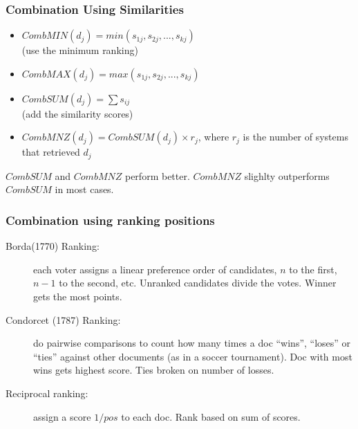 \documentclass{beamer}
\begin{document}
\begin{frame}
    \frametitle{Combination Using Similarities }

    \begin{itemize}
    \item $CombMIN(d_j) = min(s_{1j}, s_{2j}, ..., s_{kj})$ \\ (use the
        minimum ranking)

    \item $CombMAX(d_j) = max(s_{1j}, s_{2j}, ..., s_{kj})$

    \item$ CombSUM(d_j) = \sum{s_{ij}}$ \\ (add the similarity scores)

    \item $CombMNZ(d_j) = CombSUM(d_j) \times r_j$, where $r_j$ is the
        number of systems that retrieved $d_j$

    \end{itemize}

    \begin{block}{}

        $CombSUM$ and $CombMNZ$ perform better. $CombMNZ$ slighlty outperforms $CombSUM$
        in most cases.
    \end{block}
\end{frame}


\begin{frame}
    \frametitle{Combination using ranking positions }

    \begin{description}
    \item [Borda(1770) Ranking:] each voter assigns a linear preference
        order of candidates, $n$ to the first, $n-1$ to the second,
        etc. Unranked candidates divide the votes. Winner gets the most
        points.


    \item [Condorcet (1787) Ranking:] do pairwise comparisons to count how
        many times a doc ``wins'', ``loses'' or ``ties'' against other
        documents (as in a soccer tournament).  Doc with most wins gets
        highest score. Ties broken on number of losses. 

    \item [Reciprocal ranking:] assign a score $1/pos$ to each doc. Rank
        based on sum of scores.
    \end{description}


\end{frame}
\end{document}
